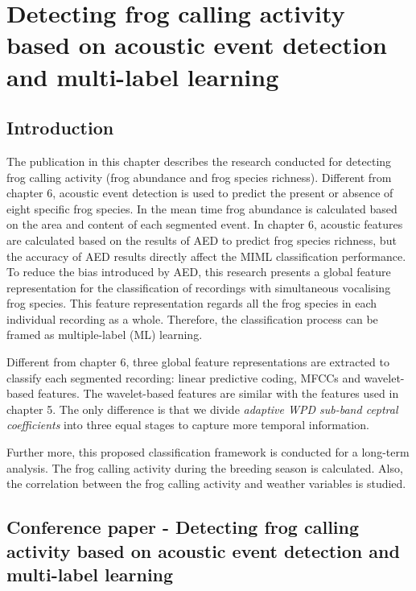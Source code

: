 
\chapter{Detecting frog calling activity based on acoustic event detection and multi-label learning}
\label{cha:cha7ML}


\section{Introduction}
\label{sect:introduction}

The publication in this chapter describes the research conducted for detecting frog calling activity (frog abundance and frog species richness). Different from chapter 6, acoustic event detection is used to predict the present or absence of eight specific frog species. In the mean time frog abundance is calculated based on the area and content of each segmented event.
In chapter 6, acoustic features are calculated based on the results of AED to predict frog species richness, but the accuracy of AED results directly affect the MIML classification performance.
To reduce the bias introduced by AED, this research presents a global feature representation for the classification of recordings with simultaneous vocalising frog species. This feature representation regards all the frog species in each individual recording as a whole. Therefore, the classification process can be framed as multiple-label (ML) learning.  



Different from chapter 6, three global feature representations are extracted to classify each segmented recording: linear predictive coding, MFCCs and wavelet-based features. The wavelet-based features are similar with the features used in chapter 5. The only difference is that we divide \textit{adaptive WPD sub-band ceptral coefficients} into three equal stages to capture more temporal information.


 
Further more, this proposed classification framework is conducted for a long-term analysis. The frog calling activity during the breeding season is calculated. Also, the correlation between the frog calling activity and weather variables is studied. 

  



\section{Conference paper - Detecting frog calling activity based on acoustic event detection and multi-label learning}





